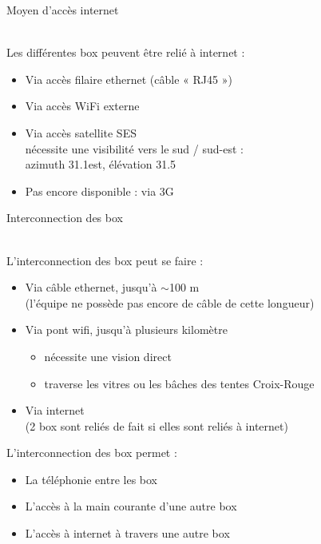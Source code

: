 \documentclass{beamer}
\begin{document}
\begin{frame}
    \begin{huge}Moyen d’accès internet\end{huge}
    \vspace{0.5cm}
    \\
    Les différentes box peuvent être relié à internet :
    \begin{itemize}
        \item Via accès filaire ethernet (câble « RJ45 »)
        \item Via accès WiFi externe
        \item Via accès satellite SES\\
            nécessite une visibilité vers le sud / sud-est :\\
            azimuth 31.1\degre est, élévation 31.5\degre
        \item Pas encore disponible : via 3G
    \end{itemize}
\end{frame}

\begin{frame}
    \begin{huge}Interconnection des box\end{huge}
    \vspace{0.5cm}
    \\
    L’interconnection des box peut se faire :
    \begin{itemize}
        \item Via câble ethernet, jusqu’à $\sim$100 m\\
            (l’équipe ne possède pas encore de câble de cette longueur)
        \item Via pont wifi, jusqu’à plusieurs kilomètre\\
            \begin{itemize}
                \item nécessite une vision direct
                \item traverse les vitres ou les bâches des tentes Croix-Rouge
            \end{itemize}
        \item Via internet\\(2 box sont reliés de fait si elles sont reliés à internet)
    \end{itemize}
    L’interconnection des box permet :
    \begin{itemize}
        \item La téléphonie entre les box
        \item L’accès à la main courante d’une autre box
        \item L’accès à internet à travers une autre box
    \end{itemize}
\end{frame}
\end{document}
